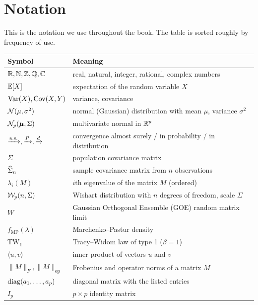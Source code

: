 
\chapter*{Notation}

This is the notation we use throughout the book. The table is sorted roughly by frequency of use.


\bigskip
\noindent
\begin{tabular}{@{}ll@{}}
  \toprule
  \textbf{Symbol} & \textbf{Meaning} \\
  \midrule
  $\mathbb{R}, \mathbb{N}, \mathbb{Z}, \mathbb{Q}, \mathbb{C}$ & real, natural, integer, rational, complex numbers \\
  $\mathbb{E}[X]$ & expectation of the random variable $X$ \\
  $\mathrm{Var}(X), \mathrm{Cov}(X, Y)$ & variance, covariance \\
  $\mathcal{N}(\mu, \sigma^2)$ & normal (Gaussian) distribution with mean $\mu$, variance $\sigma^2$ \\
  $\mathcal{N}_p(\boldsymbol\mu, \Sigma)$ & multivariate normal in $\mathbb{R}^p$ \\
  $\xrightarrow{\mathrm{a.s.}}, \xrightarrow{P}, \xrightarrow{d}$ & convergence almost surely / in probability / in distribution \\
  $\Sigma$ & population covariance matrix \\
  $\widehat{\Sigma}_n$ & sample covariance matrix from $n$ observations \\
  $\lambda_i(M)$ & $i$th eigenvalue of the matrix $M$ (ordered) \\
  $\mathcal{W}_p(n, \Sigma)$ & Wishart distribution with $n$ degrees of freedom, scale $\Sigma$ \\
  $W$ & Gaussian Orthogonal Ensemble (GOE) random matrix limit \\
  $f_{\mathrm{MP}}(\lambda)$ & Marchenko--Pastur density \\
  $\mathrm{TW}_1$ & Tracy--Widom law of type 1 ($\beta = 1$) \\
  $\langle u, v \rangle$ & inner product of vectors $u$ and $v$ \\
  $\|M\|_F, \|M\|_{\mathrm{op}}$ & Frobenius and operator norms of a matrix $M$ \\
  $\mathrm{diag}(a_1, \ldots, a_p)$ & diagonal matrix with the listed entries \\
  $I_p$ & $p \times p$ identity matrix \\
  \bottomrule
\end{tabular}
